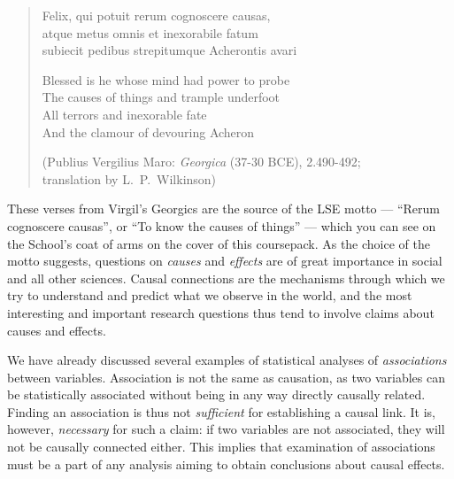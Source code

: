 \begin{verse}
Felix, qui potuit rerum cognoscere causas,\\
atque metus omnis et inexorabile fatum\\
subiecit pedibus strepitumque Acherontis avari


Blessed is he whose mind had power to probe\\
The causes of things and trample underfoot\\
All terrors and inexorable fate\\
And the clamour of devouring Acheron


(Publius Vergilius Maro: \emph{Georgica} (37-30 BCE), 2.490-492;\\
translation by L.\ P.\ Wilkinson)
\end{verse}
These verses from Virgil's Georgics are the source of the LSE motto ---
``Rerum cognoscere causas'', or ``To know the causes of things'' ---
which you can see on the School's coat of arms on the cover of this
coursepack. As the choice of the motto suggests, questions on
\emph{causes} and \emph{effects} are of great importance in social and
all other sciences. Causal connections are the mechanisms through which
we try to understand and predict what we observe in the world, and the
most interesting and important research questions thus tend to involve
claims about causes and effects.

We have already discussed several examples of statistical analyses of
\emph{associations} between variables. Association is not the same as
causation, as two variables can be statistically associated without
being in any way directly causally related. Finding an association is
thus not \emph{sufficient} for establishing a causal link. It is,
however, \emph{necessary} for such a claim: if two variables are not
associated, they will not be causally connected either. This implies
that examination of associations must be a part of any analysis aiming
to obtain conclusions about causal effects.

